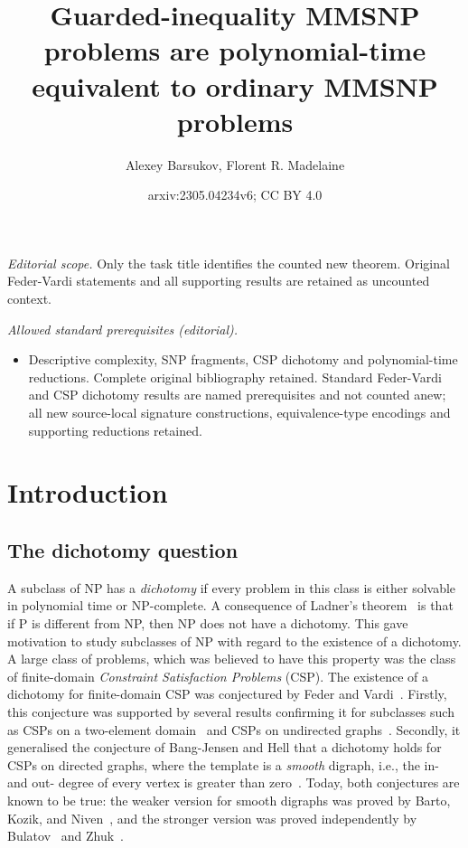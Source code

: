 \documentclass[10pt,a4paper]{amsart}
\title{Guarded-inequality MMSNP problems are polynomial-time equivalent to ordinary MMSNP problems}
\author{Alexey Barsukov, Florent R. Madelaine}
\date{arxiv:2305.04234v6; CC BY 4.0}
\theoremstyle{plain}
\theoremstyle{definition}
\numberwithin{equation}{section}
\begin{document}
\maketitle
\noindent\textit{Editorial scope.} Only the task title identifies the counted new theorem. Original Feder-Vardi statements and all supporting results are retained as uncounted context.\par\medskip
\noindent\textit{Allowed standard prerequisites (editorial).}\begin{itemize}
\item Descriptive complexity, SNP fragments, CSP dichotomy and polynomial-time reductions. Complete original bibliography retained. Standard Feder-Vardi and CSP dichotomy results are named prerequisites and not counted anew; all new source-local signature constructions, equivalence-type encodings and supporting reductions retained.
\end{itemize}\medskip
\section{Introduction}





\subsection{The dichotomy question}

A subclass of NP has a \emph{dichotomy} if every problem in this class is either solvable in polynomial time or NP-complete.
%
A consequence of Ladner's theorem~\cite{ladner1975} is that if P is different from NP, then NP does not have a dichotomy.
%
This gave motivation to study subclasses of NP with regard to the existence of a dichotomy.
%
A large class of problems, which was believed to have this property was the class of finite-domain \emph{Constraint Satisfaction Problems} (CSP).
%
The existence of a dichotomy for finite-domain CSP was conjectured by Feder and Vardi~\cite{federvardi1998}.
%
Firstly, this conjecture was supported by several results confirming it for subclasses such as CSPs on a two-element domain~\cite{schaefer1978} and CSPs on undirected graphs~\cite{hellnesetril1990}.
%
Secondly, it generalised the conjecture of Bang-Jensen and Hell that a dichotomy holds for CSPs on directed graphs, where the template is a \emph{smooth} digraph, i.e., the in- and out- degree of every vertex is greater than zero~\cite{bangjensen_hell1990}.
%
Today, both conjectures are known to be true: the weaker version for smooth digraphs was proved by Barto, Kozik, and Niven~\cite{barto_kozik_niven2009}, and the stronger version was proved independently by Bulatov~\cite{bulatov2017} and Zhuk~\cite{zhuk2020}.
%
\end{document}

